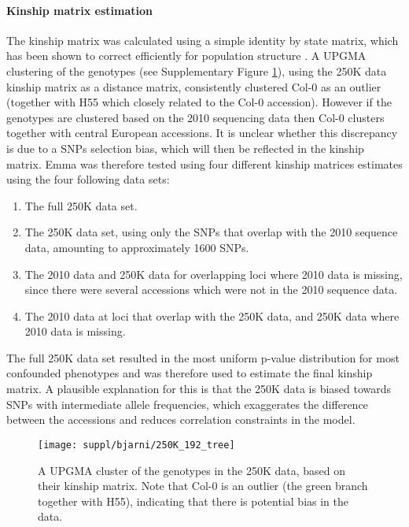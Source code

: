 \documentclass[10pt]{article}
\begin{document}
\paragraph*{Kinship matrix estimation}

The kinship matrix was calculated using a simple identity by state matrix, which has been shown to correct efficiently for population structure
\cite{kang08,zhao07}.  A UPGMA clustering of the genotypes  (see Supplementary Figure \ref{fig:250K_tree}), using the 250K data kinship matrix as a distance matrix, consistently clustered Col-0 as an outlier (together with H55 which closely related to the Col-0 accession).  However if the genotypes are clustered based on the 2010 sequencing data then Col-0 clusters together with central European accessions.  It is unclear whether this discrepancy is due to a SNPs selection bias, which will then be reflected in the kinship matrix.  Emma was therefore tested using four different kinship matrices estimates using the four following data sets:
\begin{enumerate}
\item The full 250K data set.
\item The 250K data set, using only the SNPs that overlap with the 2010 sequence data, amounting to approximately 1600 SNPs.
\item The 2010 data and 250K data for overlapping loci where 2010 data is missing, since there were several accessions which were not in the 2010 sequence data.
\item The 2010 data at loci that overlap with the 250K data, and 250K data where 2010 data is missing.
 \end{enumerate}
The full 250K data set resulted in the most uniform p-value distribution for most confounded phenotypes and was therefore used to estimate the final kinship matrix.  A plausible explanation for this is that the 250K data is biased towards SNPs with intermediate allele frequencies, which exaggerates the difference between the accessions and reduces correlation constraints in the model.

\begin{figure}%
  \centering
  \texttt{[image: suppl/bjarni/250K\_192\_tree]}
  \caption{A UPGMA cluster of the genotypes in the 250K data, based on their kinship matrix.  Note that Col-0 is an outlier (the green branch together with H55), indicating that there is potential bias in the data. }
  \label{fig:250K_tree}
\end{figure}
\end{document}
